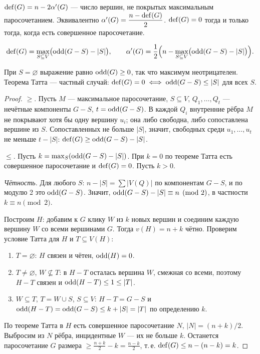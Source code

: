 \begin{definition}[Дефицит]
\(\operatorname{def}(G)=n-2\alpha'(G)\) — число вершин, не покрытых максимальным
паросочетанием. Эквивалентно \(\alpha'(G)=\dfrac{n-\operatorname{def}(G)}{2}\).
\(\operatorname{def}(G)=0\) тогда и только тогда, когда есть совершенное паросочетание.
\end{definition}
\begin{theorem}
\[
\operatorname{def}(G)=\max_{S\subseteq V}\bigl(\operatorname{odd}(G-S)-|S|\bigr),\qquad
\alpha'(G)=\frac12\Bigl(n-\max_{S\subseteq V}\bigl(\operatorname{odd}(G-S)-|S|\bigr)\Bigr).
\]
\end{theorem}
При \(S=\varnothing\) выражение равно \(\operatorname{odd}(G)\ge0\), так что максимум неотрицателен.
Теорема Татта — частный случай: \(\operatorname{def}(G)=0\iff\operatorname{odd}(G-S)\le|S|\) для всех \(S\).
\begin{proof}
\(\ge\). Пусть \(M\) — максимальное паросочетание, \(S\subseteq V\),
\(Q_1,\ldots,Q_t\) — нечётные компоненты \(G-S\), \(t=\operatorname{odd}(G-S)\). В каждой \(Q_i\)
внутренние рёбра \(M\) не покрывают хотя бы одну вершину \(u_i\); она либо свободна,
либо сопоставлена вершине из \(S\). Сопоставленных не больше \(|S|\), значит,
свободных среди \(u_1,\ldots,u_t\) не меньше \(t-|S|\): \(\operatorname{def}(G)\ge\operatorname{odd}(G-S)-|S|\).

\(\le\). Пусть \(k=\max_S(\operatorname{odd}(G-S)-|S|)\). При \(k=0\) по теореме Татта есть
совершенное паросочетание и \(\operatorname{def}(G)=0\). Пусть \(k>0\).

\emph{Чётность.} Для любого \(S\): \(n-|S|=\sum|V(Q)|\) по компонентам \(G-S\),
и по модулю 2 это \(\operatorname{odd}(G-S)\). Значит, \(\operatorname{odd}(G-S)-|S|\equiv n\pmod2\),
в частности \(k\equiv n\pmod 2\).

Построим \(H\): добавим к \(G\) клику \(W\) из \(k\) новых вершин и соединим каждую
вершину \(W\) со всеми вершинами \(G\). Тогда \(v(H)=n+k\) чётно. Проверим условие
Татта для \(H\) и \(T\subseteq V(H)\):
\begin{enumerate}\tightlist
\item \(T=\varnothing\): \(H\) связен и чётен, \(\operatorname{odd}(H)=0\).
\item \(T\ne\varnothing\), \(W\not\subseteq T\): в \(H-T\) осталась вершина \(W\), смежная
  со всеми, поэтому \(H-T\) связен и \(\operatorname{odd}(H-T)\le1\le|T|\).
\item \(W\subseteq T\), \(T=W\cup S\), \(S\subseteq V\): \(H-T=G-S\) и
  \(\operatorname{odd}(H-T)=\operatorname{odd}(G-S)\le k+|S|=|T|\) по определению \(k\).
\end{enumerate}
По теореме Татта в \(H\) есть совершенное паросочетание \(N\), \(|N|=(n+k)/2\).
Выбросим из \(N\) рёбра, инцидентные \(W\) — их не больше \(k\). Останется
паросочетание \(G\) размера \(\ge\frac{n+k}{2}-k=\frac{n-k}{2}\), т.\,е.
\(\operatorname{def}(G)\le n-(n-k)=k\).
\end{proof}


